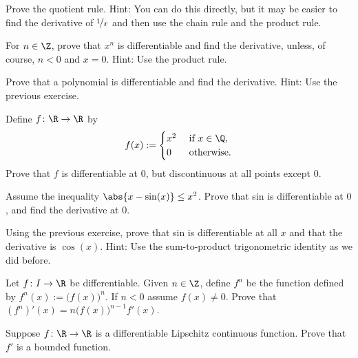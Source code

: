 \documentclass[12pt]{book}
\begin{document}
\begin{exercise}
Prove the quotient rule.
Hint: You can do this directly, but it may be
easier to find the derivative of $\nicefrac{1}{x}$ and then use
the chain rule and the product rule.
\end{exercise}

\begin{exercise} \label{exercise:diffofxn}
For $n \in \Z$,
prove that $x^n$ is differentiable and find the derivative,
unless, of course, $n < 0$ and $x=0$.
Hint: Use the product rule.
\end{exercise}

\begin{exercise}
Prove that a polynomial is differentiable and find the derivative.
Hint: Use the previous exercise.
\end{exercise}

\begin{exercise}
Define $f \colon \R \to \R$ by
\begin{equation*}
f(x) :=
\begin{cases}
x^2 & \text{ if $x \in \Q$,}\\
0 & \text{ otherwise.}
\end{cases}
\end{equation*}
Prove that $f$ is differentiable at $0$, but discontinuous at all points
except $0$.
\end{exercise}

\begin{exercise}
Assume the inequality $\abs{x-\sin(x)} \leq x^2$.
Prove that sin is
differentiable at $0$, and find the derivative at $0$.
\end{exercise}

\begin{exercise}
Using the previous exercise, prove that sin is differentiable at all $x$
and that the derivative is $\cos(x)$.
Hint: Use the sum-to-product
trigonometric identity as we did before.
\end{exercise}

\begin{exercise}
Let $f \colon I \to \R$ be differentiable.
Given $n \in \Z$, define $f^n$
be the function defined by $f^n(x) := {\bigl( f(x) \bigr)}^n$.
If
$n < 0$ assume $f(x) \not= 0$.
Prove that
$(f^n)'(x) = n {\bigl(f(x) \bigr)}^{n-1} f'(x)$.
\end{exercise}

\begin{exercise}
Suppose $f \colon \R \to \R$ is a differentiable
Lipschitz continuous function.
Prove that $f'$ is a bounded function.
\end{exercise}
\end{document}

